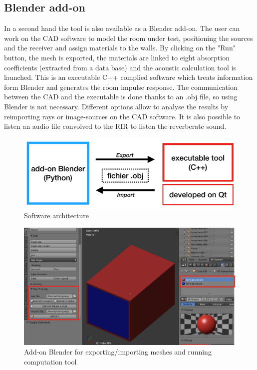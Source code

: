\documentclass[AMA,STIX1COL]{WileyNJD-v2}
\begin{document}
\subsection{Blender add-on}
In a second hand the tool is also available as a Blender add-on. The user can work on the CAD software to model the room under test, positioning the sources and the receiver and assign materials to the walls. By clicking on the "Run" button, the mesh is exported, the materials are linked to eight absorption coefficients (extracted from a data base) and the acoustic calculation tool is launched. This is an executable C++ complied software which treats information form Blender and generates the room impulse response. The communication between the CAD and the executable is done thanks to an .obj file, so using Blender is not necessary. Different options allow to analyse the results by reimporting rays or image-sources on the CAD software. It is also possible to listen an audio file convolved to the RIR to listen the reverberate sound.



\begin{figure}[h]
\centering
	\includegraphics[width=0.5\linewidth]{software}
	\caption{Software architecture}
\end{figure}

\begin{figure}[h]
\centering
	\includegraphics[width=0.8\linewidth]{add-on}
	\caption{Add-on Blender for exporting/importing meshes and running computation tool}
	\label{add-on}
\end{figure}
\end{document}
